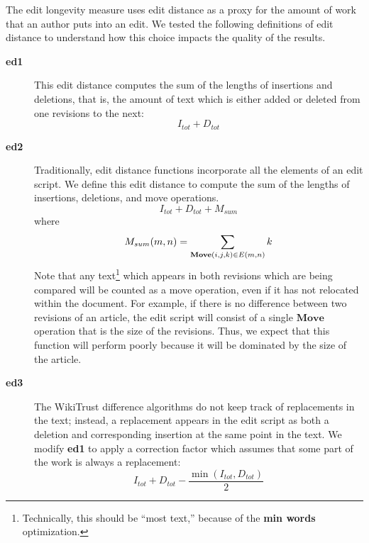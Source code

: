 The edit longevity measure uses edit distance as a proxy for the
amount of work that an author puts into an edit.
We tested the following definitions of edit distance to understand
how this choice impacts the quality of the results.
%
\begin{description}

\item[\textbf{ed1}] This edit distance computes the sum of the lengths
    of insertions and deletions, that is, the amount of text which
    is either added or deleted from one revisions to the next:
    \begin{equation*}
    I_{tot} + D_{tot}
    \end{equation*}

\item[\textbf{ed2}] Traditionally, edit distance functions incorporate
    all the elements of an edit script.  We define
    this edit distance to compute the sum of the lengths
    of insertions, deletions, and move operations.
    \begin{equation*}
    I_{tot} + D_{tot} + M_{sum}
    \end{equation*}
    where
    \begin{equation*}
    M_{sum}(m,n) = \sum_{\mathbf{Move}(i, j, k) \in E(m,n)} k \\
    \end{equation*}
    Note that any text\footnote{Technically, this should be ``most
    text,'' because of the \textbf{min words} optimization.}
    which appears in both revisions which are being
    compared will be counted as a move operation, even if it has not
    relocated within the document.
    For example, if there is no difference between two revisions of
    an article, the edit script will consist of a single $\mathbf{Move}$
    operation that is the size of the revisions.
    Thus, we expect that this function will perform poorly because
    it will be dominated by the size of the article.

\item[\textbf{ed3}]
    The WikiTrust difference algorithms do not keep track of replacements
    in the text; instead, a replacement appears in the edit script as
    both a deletion and corresponding insertion at the same point in the text.
    We modify \textbf{ed1} to apply a correction factor which
    assumes that some part of the work is always a replacement:
    \begin{equation*}
    I_{tot} + D_{tot} - \frac{\min(I_{tot}, D_{tot})}{2}
    \end{equation*}


\end{description}
